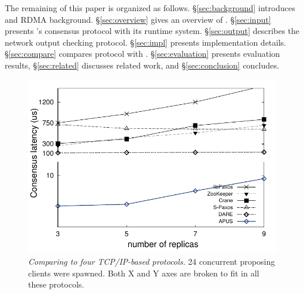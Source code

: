 The remaining of this paper is organized as follows.
\S\ref{sec:background} introduces \paxos and RDMA background.
\S\ref{sec:overview} gives an overview of \xxx. \S\ref{sec:input} presents 
\xxx's consensus protocol with its runtime system. \S\ref{sec:output} describes 
the network output checking protocol. \S\ref{sec:impl} presents implementation 
details. \S\ref{sec:compare} compares \xxx protocol with \dare. 
\S\ref{sec:evaluation} presents evaluation results, 
\S\ref{sec:related} discusses related work, and \S\ref{sec:conclusion} 
concludes. 

\begin{figure}[t]
\centering
\vspace{-.10in}
\includegraphics[width=.4\textwidth]{figures/traditional_paxos_latency}
\vspace{-.1in}
\caption{{\em Comparing \xxx to four TCP/IP-based \paxos protocols.} 24 
concurrent proposing clients were spawned. Both X and Y axes are broken to fit 
in all these protocols.}
\label{fig:scalability}
\vspace{-.25in}
\end{figure}
